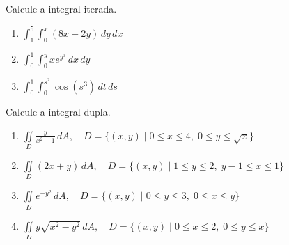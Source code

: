 




	
	\vspace{5mm}
	
	Calcule a integral iterada.
	
	\begin{enumerate}
		
		\item $\displaystyle \int_{1}^{5} \int_{0}^{x} (8x - 2y) \, dy \, dx$ 
		
		\item $\displaystyle \int_{0}^{1} \int_{0}^{y} xe^{y^{3}} \, dx \, dy$ 
		
		\item $\displaystyle \int_{0}^{1} \int_{0}^{s^{2}} \cos(s^{3}) \, dt \, ds$ 
		
		
	\end{enumerate}
	
	\vspace{5mm}
	
	Calcule a integral dupla.
	
	\begin{enumerate}[resume]
	
		\item $\displaystyle \iint \limits_{D} \frac{y}{x^2 + 1} \, dA, \quad D = \{ (x, y) \; | \; 0 \leq x \leq 4, \; 0 \leq y \leq \sqrt{x} \}$
		
		\item $\displaystyle \iint \limits_{D} (2x + y) \, dA, \quad D = \{ (x, y) \; | \; 1 \leq y \leq 2, \; y-1 \leq x \leq 1 \}$
		
		\item $\displaystyle \iint \limits_{D} e^{-y^2} \, dA, \quad D = \{ (x, y) \; | \; 0 \leq y \leq 3, \; 0 \leq x \leq y \}$
		
		\item $\displaystyle \iint \limits_{D} y \sqrt{x^2 - y^2} \, dA, \quad D = \{ (x, y) \; | \; 0 \leq x \leq 2, \; 0 \leq y \leq x \}$

	\end{enumerate}
	
